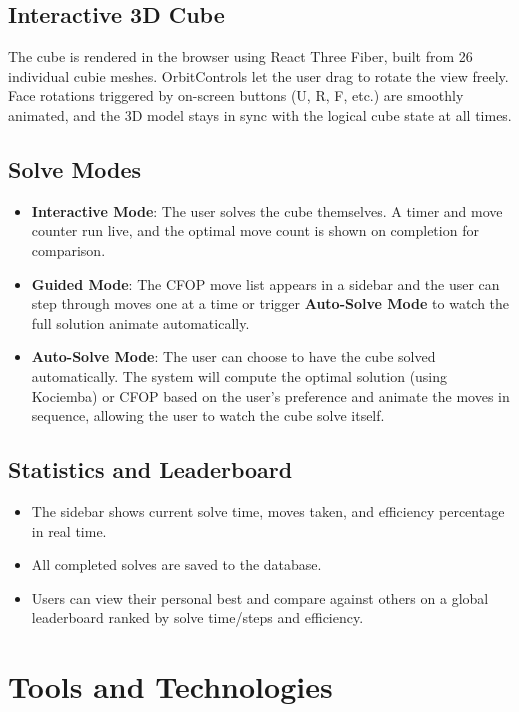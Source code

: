 \documentclass[12pt, a4paper]{article}
\begin{document}
\subsection*{Interactive 3D Cube}
The cube is rendered in the browser using React Three Fiber, built from 26 individual cubie meshes. OrbitControls let the user drag to rotate the view freely. Face rotations triggered by on-screen buttons (U, R, F, etc.) are smoothly animated, and the 3D model stays in sync with the logical cube state at all times.

\subsection*{Solve Modes}
\begin{itemize}[itemsep=0.5em, topsep=5pt]
    \item \textbf{Interactive Mode}: The user solves the cube themselves. A timer and move counter run live, and the optimal move count is shown on completion for comparison.
    \item \textbf{Guided Mode}: The CFOP move list appears in a sidebar and the user can step through moves one at a time or trigger \textbf{Auto-Solve Mode} to watch the full solution animate automatically.
    \item \textbf{Auto-Solve Mode}: The user can choose to have the cube solved automatically. The system will compute the optimal solution (using Kociemba) or CFOP based on the user's preference and animate the moves in sequence, allowing the user to watch the cube solve itself.
\end{itemize}
 

\subsection*{Statistics and Leaderboard}
\begin{itemize}[itemsep=0.5em, topsep=5pt]
    \item The sidebar shows current solve time, moves taken, and efficiency percentage in real time.
    \item All completed solves are saved to the database.
    \item Users can view their personal best and compare against others on a global leaderboard ranked by solve time/steps and efficiency.
\end{itemize}

\vspace{0.5cm}
\section{Tools and Technologies}
\end{document}
